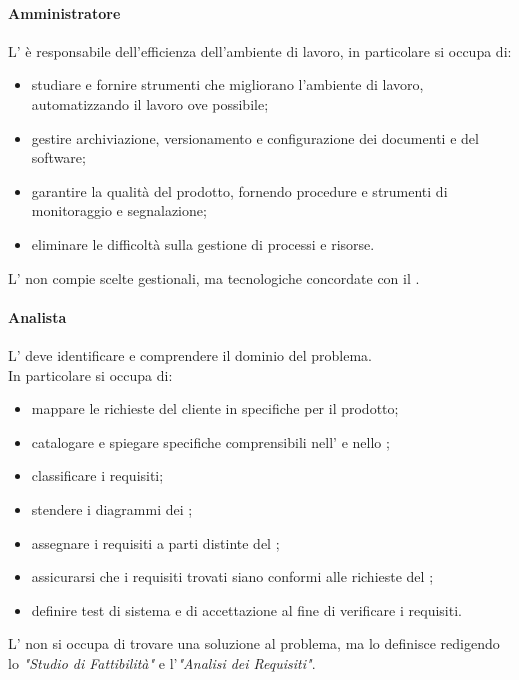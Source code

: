  \paragraph{Amministratore}
 L'\AMM{} è responsabile dell'efficienza dell'ambiente di lavoro, in particolare si occupa di:
 \begin{itemize}
  \item studiare e fornire strumenti che migliorano l'ambiente di lavoro, automatizzando il lavoro ove possibile;
  \item gestire archiviazione, versionamento e configurazione dei documenti e del software;
  \item garantire la qualità del prodotto, fornendo procedure e strumenti di monitoraggio e segnalazione;
  \item eliminare le difficoltà sulla gestione di processi e risorse.
 \end{itemize}
 L'\AMM{} non compie scelte gestionali, ma tecnologiche concordate con il \RESP.
 \paragraph{Analista}
 L'\AN{} deve identificare e comprendere il dominio del problema. \\
 In particolare si occupa di:
 \begin{itemize}
  \item mappare le richieste del cliente in specifiche per il prodotto;
  \item catalogare e spiegare specifiche comprensibili nell'\ARdoc{} e nello \SFdoc{};
  \item classificare i requisiti;
  \item stendere i diagrammi dei ;
  \item assegnare i requisiti a parti distinte del ;
  \item assicurarsi che i requisiti trovati siano conformi alle richieste del ;
  \item definire test di sistema e di accettazione al fine di verificare i requisiti.
\end{itemize}
L'\AN{} non si occupa di trovare una soluzione al problema, ma lo definisce redigendo lo \textit{"Studio di Fattibilità"} e l'\textit{"Analisi dei Requisiti"}.

